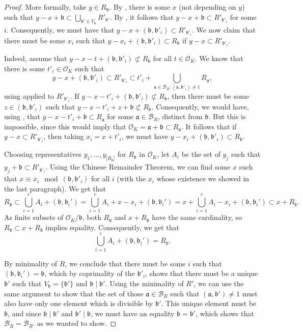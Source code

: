 \documentclass[10pt,a4paper]{amsart}
\newcommand{\cb}{\mathcal{B}}
\newcommand{\co}{\mathcal{O}}
\newcommand{\ga}{\mathfrak{a}}
\newcommand{\gb}{\mathfrak{b}}
\begin{document}
\begin{proof}
				More formally, take $y \in R_\gb$. By , there is some $x$ (not depending on $y$) such that $y-x+\gb \subset \bigcup_{\gb' \in V_\gb} R'_{\gb'}$. By , it follows that $y-x + \gb \subset R'_{\gb'_i}$ for some $i$. Consequently, we must have that $y-x+(\gb,\gb'_i) \subset R'_{\gb'_i}$. We now claim that there must be some $x_i$ such that $y-x_i+(\gb,\gb'_i) \subset R_\gb$ if $y-x \subset R'_{\gb'_i}$.
				
				Indeed, assume that $y-x-t+(\gb,\gb'_i) \not \subset R_\gb$ for all $t\in \co_K$. We know that there is some $t'_i\in \co_K$ such that $$y-x+(\gb,\gb'_i) \subset R'_{\gb'_i} \subset t'_i+\bigcup_{\ga \in \cb_R: (\ga,\gb'_i) \neq 1 }R_\ga,$$ using  applied to $R'_{\gb'_i}$. If $y-x-t'_i+(\gb,\gb'_i) \not \subset R_\gb$, then there must be some $z \in (\gb,\gb'_i)$ such that $y-x-t'_i+z+\gb \not \subset R_\gb$. Consequently, we would have, using , that  $y-x-t'_i+\gb \subset R_\ga$ for some $\ga \in \cb_R$, distinct from $\gb$. But this is impossible, since this would imply that $\co_K = \ga+\gb \subset R_\ga$. It follows that if $y-x \subset R'_{\gb'_i}$, then taking $x_i = x+t'_i$, we must have $y-x_i + (\gb,\gb'_i) \subset R_\gb$.
				
				Choosing representatives $y_1,\dots,y_{|R_\gb|}$ for $R_\gb$ in $\co_K$, let $A_i$ be the set of $y_j$ such that $y_j + \gb \subset R'_{\gb'_i}$. Using the Chinese Remainder Theorem, we can find some $x$ such that $x \equiv x_i \mod (\gb,\gb'_i)$ for all $i$ (with the $x_i$ whose existence we showed in the last paragraph). We get that $$R_\gb \subset \bigcup_{i=1}^r A_i + (\gb,\gb_i') = \bigcup_{i=1}^r A_i +x-x_i + (\gb,\gb_i') = x+\bigcup_{i=1}^r A_i -x_i+ (\gb,\gb_i')  \subset x+ R_\gb.$$ As finite subsets of $\co_K/\gb$, both $R_\gb$ and $x+R_\gb$ have the same cardinality, so $R_\gb \subset x+R_\gb$ implies equality. Consequently, we get that
				$$\bigcup_{i=1}^r A_i + (\gb,\gb_i') = R_\gb.$$ 
				
				By minimality of $R$, we conclude that there must be some $i$ such that $ (\gb,\gb_i') = \gb$, which by coprimality of the $\gb'_i$, shows that there must be a unique $\gb'$ such that $V_\gb = \{\gb'\}$ and $\gb \mid \gb'$. Using the minimality of $R'$, we can use the same argument to show that the set of those $\ga \in \cb_R$ such that $(\ga,\gb') \neq 1$ must also have only one element which is divisible by $\gb'$. This unique element must be $\gb$, and since $\gb \mid \gb'$ and $\gb' \mid \gb$, we must have an equality $\gb = \gb'$, which shows that $\cb_R = \cb_{R'}$ as we wanted to show.
			\end{proof}
\end{document}
